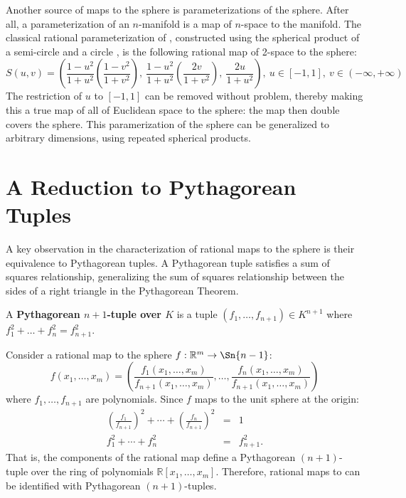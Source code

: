 \documentclass[12pt]{article}
\begin{document}
Another source of maps to the sphere is parameterizations of the sphere.
After all, a parameterization of an $n$-manifold is a map of $n$-space
to the manifold.
The classical rational parameterization of , constructed using the
spherical product of a semi-circle and a circle \cite{barr81},
is the following rational map of 2-space to the sphere:
\begin{equation}
\label{eq:s2param}
S(u,v) = (\frac{1-u^2}{1+u^2}(\frac{1-v^2}{1+v^2}),\  
          \frac{1-u^2}{1+u^2}(\frac{2v}{1+v^2}),\  \frac{2u}{1+u^2}),\ 
u \in [-1,1],\ v \in (-\infty,+\infty)
\end{equation}
The restriction of $u$ to $[-1,1]$
can be removed without problem, thereby making this a true map of all of Euclidean
space to the sphere: the map then double covers the sphere.
This paramerization of the sphere can be generalized to arbitrary dimensions, using
repeated spherical products.


\section{A Reduction to Pythagorean Tuples}
\label{sec:ratpy}

A key observation in the characterization of rational maps to the sphere is their
equivalence to Pythagorean tuples.
A Pythagorean tuple satisfies a sum of squares relationship,
generalizing the sum of squares relationship between the sides of a right triangle
in the Pythagorean Theorem.

\begin{defn2}
A {\bf Pythagorean $n+1$-tuple over $K$} %
is a tuple $(f_1,\ldots,f_{n+1}) \in K^{n+1}$
where $f_1^2 + \ldots + f_n^2 = f_{n+1}^2$.
\end{defn2}

Consider a rational map to the sphere $f: \mathbb{R}^m \rightarrow \Sn{n-1}$:
\[
	f(x_1,\ldots,x_m) =
	(\frac{f_1(x_1,\ldots,x_m)}{f_{n+1}(x_1,\ldots,x_m)}, \ldots,
	 \frac{f_n(x_1,\ldots,x_m)}{f_{n+1}(x_1,\ldots,x_m)})
\]
where $f_1,\ldots,f_{n+1}$ are polynomials.
Since $f$ maps to the unit sphere at the origin:
\begin{eqnarray}
       (\frac{f_1}{f_{n+1}})^2 + \cdots + (\frac{f_n}{f_{n+1}})^2 & = & 1 \\
	f_1^2 + \cdots + f_n^2 & = & f_{n+1}^2.
\end{eqnarray}
That is, the components of the rational map define a Pythagorean $(n+1)$-tuple
over the ring of polynomials $\mathbb{R}[x_1,\ldots,x_m]$.
Therefore, rational maps to \Sn{n-1} can be identified with Pythagorean $(n+1)$-tuples.
\end{document}
